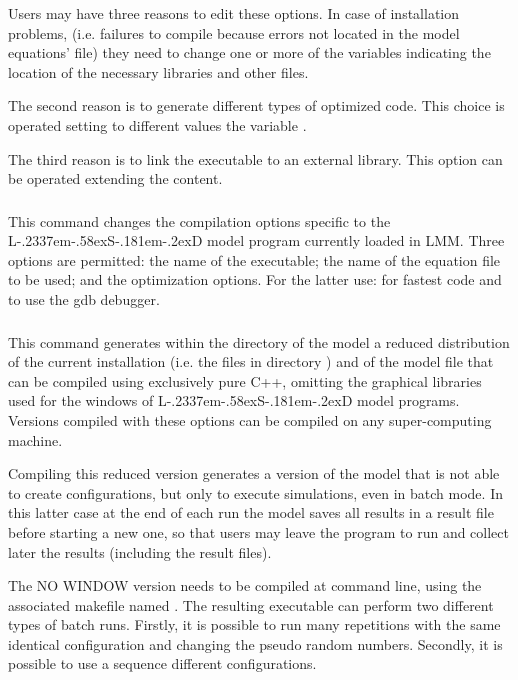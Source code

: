 \documentclass [11pt,a4paper] {book}
\def\LsD{{L\kern-.2337em\lower-.58ex\hbox{S}\kern-.181em\lower-.2ex\hbox{D}}\xspace}
\begin{document}
Users may have three reasons to edit these options. In case of installation problems, (i.e. failures to compile because errors not located in the model equations' file) they need to change one or more of the variables indicating the location of the necessary libraries and other files.

The second reason is to generate different types of optimized code. This choice is operated setting to different values the variable .

The third reason is to link the executable to an external library. This option can be operated extending the  content.

\subsubsection{}

This command changes the compilation options specific to the \LsD model program currently loaded in LMM. Three options are permitted: the name of the executable; the name of the equation file to be used; and the optimization options. For the latter use:  for fastest code and  to use the gdb debugger.


\subsubsection{}\label{ssec:nowin}
This command generates within the directory of the model a reduced distribution of the current installation (i.e. the files in directory ) and of the model file that can be compiled using exclusively pure C++, omitting the graphical libraries 	used for the windows of \LsD model programs. Versions compiled with these options can be compiled on any super-computing machine.

Compiling this reduced version generates a version of the model that is not able to create configurations, but only to execute simulations, even in batch mode. In this latter case at the end of each run the model saves all results in a result  file before starting a new one, so that users may leave the program to run and collect later the results (including the  result files).

The NO WINDOW version needs to be compiled at command line, using the associated makefile named . The resulting executable can perform two different types of batch runs. Firstly, it is possible to run many repetitions with the same identical configuration and changing the pseudo random numbers. Secondly, it is possible to use a sequence different configurations.
\end{document}
